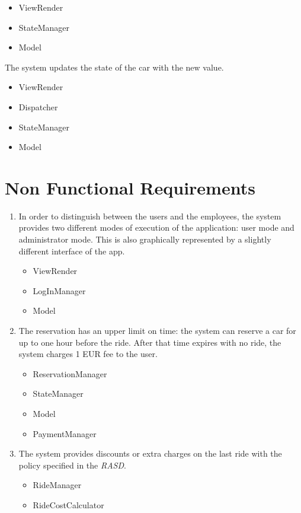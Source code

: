 \documentclass[11pt,a4paper]{report}
\begin{document}
\begin{Req}
			\begin{itemize}
				\item ViewRender
				\item StateManager
				\item Model
			\end{itemize}
		\item The system updates the state of the car with the new value.
			\begin{itemize}
				\item ViewRender
				\item Dispatcher
				\item StateManager
				\item Model
			\end{itemize}
	\end{Req}
\section{Non Functional Requirements}
\begin{enumerate}
	\item In order to distinguish between the users and the employees, the system provides two different modes of execution of the application: user mode and administrator mode. This is also graphically represented by a slightly different interface of the app.
	\begin{itemize}
		\item ViewRender
		\item LogInManager
		\item Model
	\end{itemize}
	\item The reservation has an upper limit on time: the system can reserve a car for up to one hour before the ride. After that time expires with no ride, the system charges 1 EUR fee to the user.
	\begin{itemize}
		\item ReservationManager
		\item StateManager
		\item Model
		\item PaymentManager
	\end{itemize}
	\item The system provides discounts or extra charges on the last ride with the policy specified in the \textit{RASD}.
	\begin{itemize}
		\item RideManager
		\item RideCostCalculator
	\end{itemize}
\end{enumerate}
\end{document}
